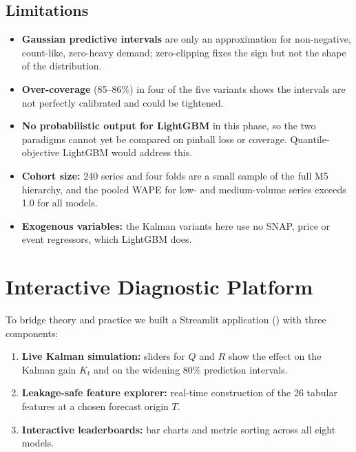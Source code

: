 \documentclass[11pt,a4paper]{article}
\DeclareRobustCommand{\code}[1]{\texttt{\detokenize{#1}}}
\begin{document}
\subsection{Limitations}
\begin{itemize}[leftmargin=2em,itemsep=2pt]
  \item \textbf{Gaussian predictive intervals} are only an approximation for non-negative, count-like, zero-heavy demand; zero-clipping fixes the sign but not the shape of the distribution.
  \item \textbf{Over-coverage} (85--86\%) in four of the five variants shows the intervals are not perfectly calibrated and could be tightened.
  \item \textbf{No probabilistic output for LightGBM} in this phase, so the two paradigms cannot yet be compared on pinball loss or coverage. Quantile-objective LightGBM would address this.
  \item \textbf{Cohort size:} 240 series and four folds are a small sample of the full M5 hierarchy, and the pooled WAPE for low- and medium-volume series exceeds 1.0 for all models.
  \item \textbf{Exogenous variables:} the Kalman variants here use no SNAP, price or event regressors, which LightGBM does.
\end{itemize}

\section{Interactive Diagnostic Platform}
To bridge theory and practice we built a Streamlit application (\code{app.py}) with three components:
\begin{enumerate}[leftmargin=2em,itemsep=2pt]
  \item \textbf{Live Kalman simulation:} sliders for $Q$ and $R$ show the effect on the Kalman gain $K_t$ and on the widening 80\% prediction intervals.
  \item \textbf{Leakage-safe feature explorer:} real-time construction of the 26 tabular features at a chosen forecast origin $T$.
  \item \textbf{Interactive leaderboards:} bar charts and metric sorting across all eight models.
\end{enumerate}

\end{document}
